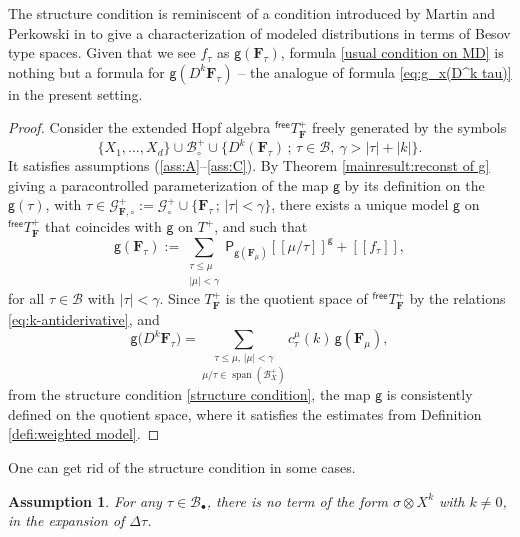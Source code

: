 \documentclass[11pt]{article}
\numberwithin{equation}{section}
\newcommand{\sbullet}{{\scriptscriptstyle\bullet}}
\DeclareMathOperator{\Span}{span}
\theoremstyle{plain}
\newtheorem{assumption}{Assumption}
\theoremstyle{definition}
\newcommand{\Brac}[1]{[\![#1]\!]}
\newcommand{\sfP}{\mathsf{P}}
\newcommand{\sfg}{\mathsf{g}}
\newcommand{\bsF}{\boldsymbol{F}}
\newcommand{\mcB}{\mathcal{B}}
\newcommand{\mcG}{\mathcal{G}}
\begin{document}
The structure condition is reminiscent of a condition introduced by Martin and Perkowski in \cite{MP18} to give a characterization of modeled distributions in terms of Besov type spaces. Given that we see $f_\tau$ as $\sfg({\bsF}_\tau)$, formula \eqref{usual condition on MD} is nothing but a formula for ${\sfg}(D^k{\bsF}_\tau)$ -- the analogue of formula \eqref{eq:g_x(D^k tau)} in the present setting.

\begin{proof}
Consider the extended Hopf algebra $^\textsf{free}T_{\bsF}^+$ freely generated by the symbols
\[
\{X_1,\dots,X_d\}\cup\mcB_\circ^+\cup\big\{D^k(\bsF_\tau)\,;\, \tau\in\mcB,\ \gamma>|\tau|+|k|\big\}.
\]
It satisfies assumptions (\ref{ass:A}--\ref{ass:C}).
By Theorem \ref{mainresult:reconst of g} giving a paracontrolled parameterization of the map $\sfg$ by its definition on the $\sfg(\tau)$, with $\tau\in\mcG^+_{\bsF,\circ} := \mcG^+_\circ\cup\big\{{\bsF}_\tau\,;\,\vert\tau\vert<\gamma\big\}$, there exists a unique model $\sfg$ on $^\textsf{free}T_{\bsF}^+$ that coincides with $\sfg$ on $T^+$, and such that
\[
\sfg(\bsF_\tau) := \sum_{\substack{\tau\le\mu\\|\mu|<\gamma}}\sfP_{\sfg(\bsF_\mu)}\Brac{\mu/\tau}^{\sfg} + \Brac{f_\tau},
\]
for all $\tau\in\mcB$ with $\vert\tau\vert<\gamma$. Since $T_{\bsF}^+$ is the quotient space of $^\textsf{free}T_{\bsF}^+$ by the relations \eqref{eq:k-antiderivative}, and
\[
\sfg\bigl(D^k\bsF_\tau\bigr) = \underset{\mu/\tau\in\Span (\mcB_X^+)}{\sum_{\tau\leq\mu, \,|\mu|<\gamma}} c_\tau^\mu(k)\,\sfg(\bsF_\mu),
\]
from the structure condition \eqref{structure condition}, the map $\sfg$ is consistently defined on the quotient space, where it satisfies the estimates from Definition \ref{defi:weighted model}.
\end{proof}

One can get rid of the structure condition in some cases.

\begin{assumption}\label{ass:D}
For any $\tau\in\mcB_\sbullet$, there is no term of the form $\sigma\otimes X^k$ with $k\neq0$, in the expansion of $\Delta\tau$.
\end{assumption}
\end{document}
